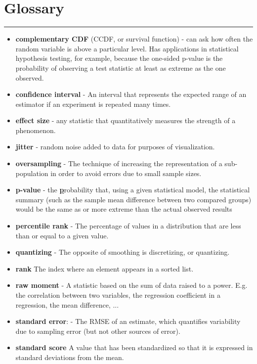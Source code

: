 \section{Glossary}
\smallskip \hrule height 2pt \smallskip
 
 \begin{itemize}
 	\item \textbf{complementary CDF} (CCDF, or survival function) - can ask how often the random variable is above a particular level.
		Has applications in statistical hypothesis testing, for example, because the one-sided p-value 
			is the probability of observing a test statistic at least as extreme as the one observed.
 	\item \textbf{confidence interval} - An interval that represents the expected range of an estimator if 
		an experiment is repeated many times.
	\item \textbf{effect size} - any statistic that quantitatively measures the strength of a phenomenon.
	\item \textbf{jitter} - random noise added to data for purposes of visualization.  
 	\item \textbf{oversampling} - The technique of increasing the representation of a sub-population in order to avoid errors due to small sample sizes.  
	\item \textbf{p-value} - the \underline{\textbf{p}}robability that, using a given statistical model, the statistical summary 
		(such as the sample mean difference between two compared groups) would be the same as or more extreme 
		than the actual observed results
	\item \textbf{percentile rank} - The percentage of values in a distribution that are less than or equal to a given value.
	\item \textbf{quantizing} - The opposite of smoothing is discretizing, or quantizing.
	\item \textbf{rank} The index where an element appears in a sorted list.
	\item \textbf{raw moment} - A statistic based on the sum of data raised to a power.
		E.g. the correlation between two variables, the regression coefficient in a regression, the mean difference, ...
	\item \textbf{standard error}: - The RMSE of an estimate, which quantifies variability due to sampling error 
		(but not other sources of error).
	\item \textbf{standard score} A value that has been standardized so that it is expressed in standard deviations from the mean.

 \end{itemize}

